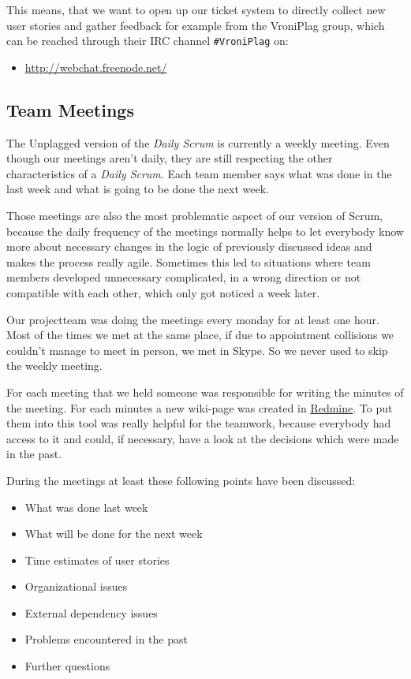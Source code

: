 This means, that we want to open up our ticket system to directly collect new user stories and gather feedback for 
example from the VroniPlag group, which can be reached through their IRC channel \texttt{\#VroniPlag} on:

\begin{itemize}
\item \url{http://webchat.freenode.net/}
\end{itemize} 


\subsection{Team Meetings}

The Unplagged version of the \textit{Daily Scrum} is currently a weekly meeting. Even though our meetings aren't daily, they 
are still respecting the other characteristics of a \textit{Daily Scrum}. Each team member says what was done in 
the last week and what is going to be done the next week. 

Those meetings are also the most problematic aspect of our version of Scrum, because the daily frequency of the 
meetings normally 
helps to let everybody know more about necessary changes in the logic of previously discussed ideas and makes the 
process
really agile. Sometimes this led to situations where team members developed unnecessary complicated, in a wrong direction
or not compatible with each other, which only got noticed a week later.

Our projectteam was doing the meetings every monday for at least one hour. Most of the times we met at the same place, 
if due to appointment collisions we couldn't manage to meet in person, we met in Skype. So we never used to skip the 
weekly meeting.

For each meeting that we held someone was responsible for writing the minutes of the meeting. For each minutes a 
new wiki-page was created in \href{http://www.redmine.org/}{Redmine}. To put them into this tool
was really helpful for the teamwork, because everybody had access to it and could, 
if necessary, have a look at the decisions which were made in the past.

During the meetings at least these following points have been discussed:

\begin{itemize}
\item What was done last week 
\item What will be done for the next week
\item Time estimates of user stories
\item Organizational issues
\item External dependency issues
\item Problems encountered in the past
\item Further questions
\end{itemize}

